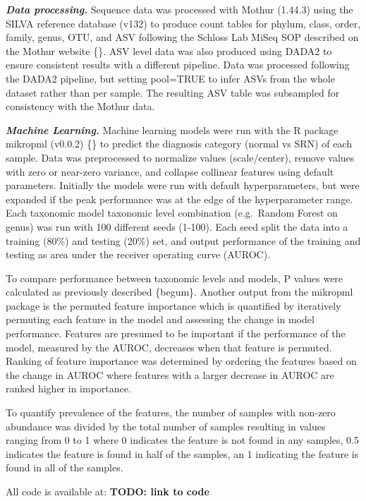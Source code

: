 \documentclass[
]{article}
\begin{document}
\textbf{\emph{Data processing.}} Sequence data was processed with Mothur
(1.44.3) using the SILVA reference database (v132) to produce count
tables for phylum, class, order, family, genus, OTU, and ASV following
the Schloss Lab MiSeq SOP described on the Mothur website \{\}. ASV
level data was also produced using DADA2 to ensure consistent results
with a different pipeline. Data was processed following the DADA2
pipeline, but setting pool=TRUE to infer ASVs from the whole dataset
rather than per sample. The resulting ASV table was subsampled for
consistency with the Mothur data.

\textbf{\emph{Machine Learning.}} Machine learning models were run with
the R package mikropml (v0.0.2) \{\} to predict the diagnosis category
(normal vs SRN) of each sample. Data was preprocessed to normalize
values (scale/center), remove values with zero or near-zero variance,
and collapse collinear features using default parameters. Initially the
models were run with default hyperparameters, but were expanded if the
peak performance was at the edge of the hyperparameter range. Each
taxonomic model taxonomic level combination (e.g.~Random Forest on
genus) was run with 100 different seeds (1-100). Each seed split the
data into a training (80\%) and testing (20\%) set, and output
performance of the training and testing as area under the receiver
operating curve (AUROC).

To compare performance between taxonomic levels and models, P values
were calculated as previously described \{begum\}. Another output from
the mikropml package is the permuted feature importance which is
quantified by iteratively permuting each feature in the model and
assessing the change in model performance. Features are presumed to be
important if the performance of the model, measured by the AUROC,
decreases when that feature is permuted. Ranking of feature importance
was determined by ordering the features based on the change in AUROC
where features with a larger decrease in AUROC are ranked higher in
importance.

To quantify prevalence of the features, the number of samples with
non-zero abundance was divided by the total number of samples resulting
in values ranging from 0 to 1 where 0 indicates the feature is not found
in any samples, 0.5 indicates the feature is found in half of the
samples, an 1 indicating the feature is found in all of the samples.

All code is available at: \textbf{TODO: link to code}
\end{document}
